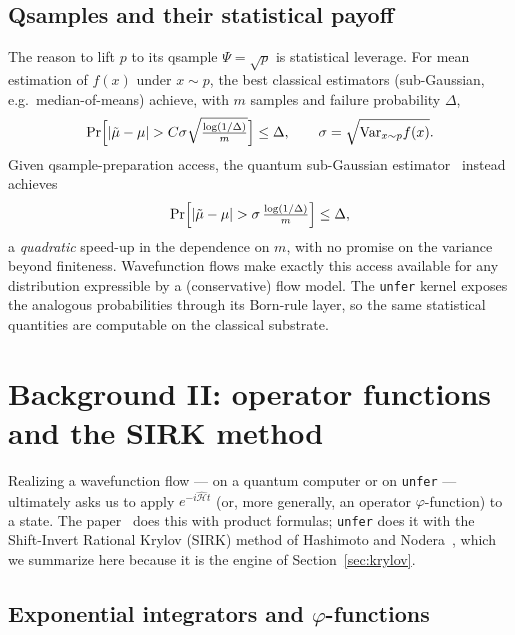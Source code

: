 \documentclass[11pt, a4paper]{article}
\newcommand{\Hgen}{\hat{\mathcal{H}}}
\begin{document}
\subsection{Qsamples and their statistical payoff}
\label{sec:qsample}

The reason to lift $p$ to its qsample $\Psi=\sqrt p$ is statistical leverage.
For mean estimation of $f(x)$ under $x\sim p$, the best classical estimators
(sub-Gaussian, e.g.\ median-of-means) achieve, with $m$ samples and failure
probability $\Delta$,
\begin{equation}
  \Pr\Bigl[|\tilde\mu-\mu|>C\sigma\sqrt{\tfrac{\log(1/\Delta)}{m}}\Bigr]\le\Delta,
  \qquad \sigma=\sqrt{\mathrm{Var}_{x\sim p}f(x)} .
\end{equation}
Given qsample-preparation access, the quantum sub-Gaussian
estimator~\cite{Layden2025} instead achieves
\begin{equation}
  \Pr\Bigl[|\tilde\mu-\mu|>\sigma\,\tfrac{\log(1/\Delta)}{m}\Bigr]\le\Delta,
\end{equation}
a \emph{quadratic} speed-up in the dependence on $m$, with no promise on the
variance beyond finiteness. Wavefunction flows make exactly this access
available for any distribution expressible by a (conservative) flow model. The
\texttt{unfer} kernel exposes the analogous probabilities through its Born-rule
layer, so the same statistical quantities are computable on the classical
substrate.

\section{Background II: operator functions and the SIRK method}

Realizing a wavefunction flow --- on a quantum computer or on \texttt{unfer} ---
ultimately asks us to apply $e^{-i\Hgen t}$ (or, more generally, an operator
$\varphi$-function) to a state. The paper~\cite{Layden2025} does this with
product formulas; \texttt{unfer} does it with the Shift-Invert Rational Krylov
(SIRK) method of Hashimoto and Nodera~\cite{Hashimoto2019}, which we summarize
here because it is the engine of Section~\ref{sec:krylov}.

\subsection{Exponential integrators and \texorpdfstring{$\varphi$}{phi}-functions}
\end{document}
